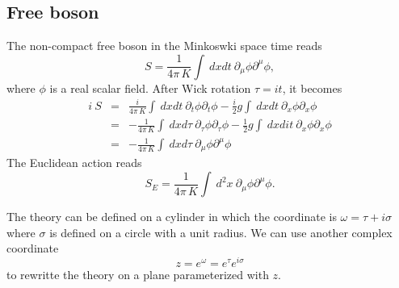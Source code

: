 \documentclass[submission, PhysLectNotes]{SciPost}
\begin{document}
\subsection{Free boson}
The non-compact free boson in the Minkoswki space time reads
\begin{equation}
    S = \frac{1}{4\pi\,K}\int \ dxdt \ \partial_\mu \phi \partial^\mu \phi,
\end{equation}
where $\phi$ is a real scalar field. After Wick rotation $\tau = it$, it becomes
\begin{eqnarray}
    i\ S &=& \frac{i}{4\pi\,K}\int \ dxdt \ \partial_t \phi \partial_t \phi - \frac{i}{2}g\int \ dxdt \ \partial_x \phi \partial_x \phi \nonumber \\
    &=& -\frac{1}{4\pi\,K}\int \ dxd\tau \ \partial_\tau \phi \partial_\tau \phi - \frac{1}{2}g\int \ dxdit \ \partial_x \phi \partial_x \phi \nonumber \\
    &=& -\frac{1}{4\pi\,K}\int \ dxd\tau \ \partial_\mu \phi \partial^\mu \phi
\end{eqnarray}
The Euclidean action reads
\begin{equation}
    S_E = \frac{1}{4\pi\,K}\int \ d^2x \ \partial_\mu \phi \partial^\mu \phi.
\end{equation}

The theory can be defined on a cylinder in which the coordinate is $\omega = \tau + i\sigma$ where $\sigma$ is defined on a circle with a unit radius. We can use another complex coordinate
\begin{equation}
  z = e^\omega = e^\tau e^{i\sigma}
\end{equation}
to rewritte the theory on a plane parameterized with $z$.
\end{document}
